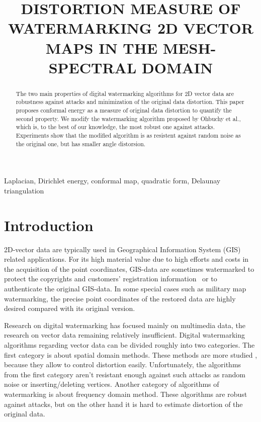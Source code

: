 \documentclass{article}
\title{DISTORTION MEASURE OF WATERMARKING 2D VECTOR MAPS IN THE MESH-SPECTRAL DOMAIN}
\begin{document}
\maketitle
\begin{abstract}
The two main properties of digital watermarking algorithms for 2D vector data are robustness against attacks and minimization of the original data distortion. 
This paper proposes conformal energy as a measure of original data distortion to quantify the second property. We modify the watermarking algorithm proposed by Ohbuchy et al., 
which is, to the best of our knowledge, the most robust one against attacks. Experiments show that the modified algorithm is as resistent against random noise as the original one, but has 
smaller angle distorsion.
\end{abstract}
%
\begin{keywords}
Laplacian, Dirichlet energy, conformal map, quadratic form, Delaunay triangulation
\end{keywords}
%
\section{Introduction}
\label{sec:intro}
2D-vector data are typically used in Geographical Information System (GIS) related applications. For its high material value due to high efforts and costs in the acquisition of the point coordinates, 
GIS-data are sometimes watermarked to protect the copyrights and customers’ registration information~\cite{Voight} or to authenticate the original GIS-data. In some special cases such as military map watermarking, 
the precise point coordinates of the restored data are highly desired compared with its original version.  

Research on digital watermarking has focused mainly on multimedia data, the research on vector data remaining relatively insufficient. 
Digital watermarking algorithms regarding vector data can be divided roughly into two categories. The first category is about spatial domain methods. These methods are more studied \cite{Voight, Kim, Chang, Bazin}, 
because they allow to control distortion easily. Unfortunately, the algorithms from the first category aren't resistant enough against such attacks as random noise or inserting/deleting vertices.
Another category of algorithms of watermarking is about frequency domain method. These algorithms \cite{Ohbuchi, Ohbuchi3D, Praun} are robust against attacks, 
but on the other hand it is hard to estimate distortion of the original data.
 
\end{document}
